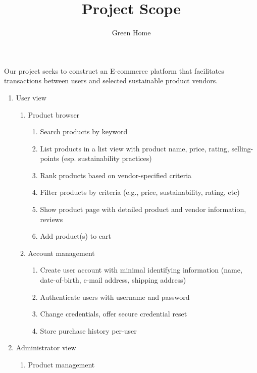 \documentclass{article}
\title{Project Scope}
\author{Green Home}
\begin{document}
\maketitle

Our project seeks to construct an E-commerce platform that facilitates
transactions between users and selected sustainable product vendors.
\begin{enumerate}
  \item User view
        \begin{enumerate}
          \item Product browser
                \begin{enumerate}
                  \item Search products by keyword
                  \item List products in a list view with product name, price,
                        rating, selling-points (esp. sustainability practices)
                  \item Rank products based on vendor-specified criteria
                  \item Filter products by criteria (e.g., price,
                        sustainability, rating, etc)
                  \item Show product page with detailed product and vendor
                        information, reviews
                  \item Add product(s) to cart
                \end{enumerate}
          \item Account management
                \begin{enumerate}
                  \item Create user account with minimal identifying information
                        (name, date-of-birth, e-mail address, shipping address)
                  \item Authenticate users with username and password
                  \item Change credentials, offer secure credential reset
                  \item Store purchase history per-user
                \end{enumerate}
        \end{enumerate}
  \item Administrator view
        \begin{enumerate}
          \item Product management
                \begin{enumerate}

\end{enumerate}
\end{enumerate}
\end{enumerate}
\end{document}
